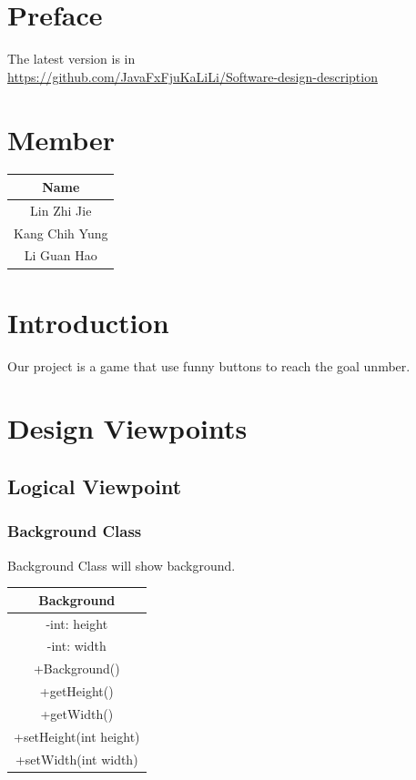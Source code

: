 \section{Preface}
The latest version is in\\ \url{https://github.com/JavaFxFjuKaLiLi/Software-design-description}

\tableofcontents

\section{Member}
\begin{center}\begin{tabular}{ |c| } \hline Name \\ \hline Lin Zhi Jie \\ \hline Kang Chih Yung \\ \hline Li Guan Hao \\ \hline \end{tabular}\end{center}

\section{Introduction}
Our project is a game that use funny buttons to reach the goal unmber.
\section{Design Viewpoints}

\subsection{Logical Viewpoint}

\subsubsection{Background Class}
Background Class will show background.
\begin{center}\begin{tabular}{ |c| } \hline Background \\ \hline -int: height \\ -int: width \\ \hline +Background() \\ +getHeight() \\ +getWidth() \\ +setHeight(int height) \\ +setWidth(int width) \\ \hline \end{tabular}\end{center}

